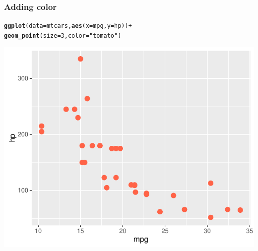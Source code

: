 \documentclass[12pt]{beamer}\usepackage[]{graphicx}\usepackage[]{color}
\makeatletter
\newcommand{\hlnum}[1]{\textcolor[rgb]{0.686,0.059,0.569}{#1}}%
\newcommand{\hlstr}[1]{\textcolor[rgb]{0.192,0.494,0.8}{#1}}%
\newcommand{\hlopt}[1]{\textcolor[rgb]{0,0,0}{#1}}%
\newcommand{\hlstd}[1]{\textcolor[rgb]{0.345,0.345,0.345}{#1}}%
\newcommand{\hlkwc}[1]{\textcolor[rgb]{0.333,0.667,0.333}{#1}}%
\newcommand{\hlkwd}[1]{\textcolor[rgb]{0.737,0.353,0.396}{\textbf{#1}}}%
\newenvironment{kframe}{%
 \def\at@end@of@kframe{}%
 \ifinner\ifhmode%
  \def\at@end@of@kframe{\end{minipage}}%
  \begin{minipage}{\columnwidth}%
 \fi\fi%
 \def\FrameCommand##1{\hskip\@totalleftmargin \hskip-\fboxsep
 \colorbox{shadecolor}{##1}\hskip-\fboxsep
     \hskip-\linewidth \hskip-\@totalleftmargin \hskip\columnwidth}%
 \MakeFramed {\advance\hsize-\width
   \@totalleftmargin\z@ \linewidth\hsize
   \@setminipage}}%
 {\par\unskip\endMakeFramed%
 \at@end@of@kframe}
\newenvironment{knitrout}{}{} %
\makeatother
\begin{document}

\begin{frame}[fragile]
\frametitle{Adding color}
\begin{knitrout}\scriptsize
{}\color{fgcolor}\begin{kframe}
\begin{alltt}
\hlkwd{ggplot}\hlstd{(}\hlkwc{data} \hlstd{= mtcars,} \hlkwd{aes}\hlstd{(}\hlkwc{x} \hlstd{= mpg,} \hlkwc{y} \hlstd{= hp))} \hlopt{+}
  \hlkwd{geom_point}\hlstd{(}\hlkwc{size} \hlstd{=} \hlnum{3}\hlstd{,} \hlkwc{color} \hlstd{=} \hlstr{"tomato"}\hlstd{)}
\end{alltt}
\end{kframe}

{\centering \includegraphics[width=.7\linewidth,height=.6\linewidth]{figure/xyplot_mtcars3-1} 

}



\end{knitrout}
\end{frame}

\end{document}
